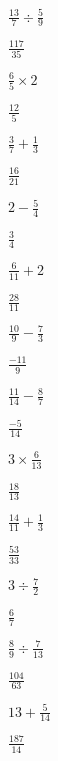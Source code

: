 \documentclass[12pt]{exam}
\begin{document}
\begin{questions}
\begin{multicols}{2}
			\question $\frac{13}{7} \div \frac{5}{9}$
			\begin{solution}
				$\frac{117}{35}$
			\end{solution}

			\question $\frac{6}{5} \times 2$
			\begin{solution}
				$\frac{12}{5}$
			\end{solution}

			\question $\frac{3}{7} + \frac{1}{3}$
			\begin{solution}
				$\frac{16}{21}$
			\end{solution}

			\question $2 - \frac{5}{4}$
			\begin{solution}
				$\frac{3}{4}$
			\end{solution}

			\question $\frac{6}{11} + 2$
			\begin{solution}
				$\frac{28}{11}$
			\end{solution}

			\question $\frac{10}{9} - \frac{7}{3}$
			\begin{solution}
				$\frac{-11}{9}$
			\end{solution}

			\question $\frac{11}{14} - \frac{8}{7}$
			\begin{solution}
				$\frac{-5}{14}$
			\end{solution}

			\question $3 \times \frac{6}{13}$
			\begin{solution}
				$\frac{18}{13}$
			\end{solution}

			\question $\frac{14}{11} + \frac{1}{3}$
			\begin{solution}
				$\frac{53}{33}$
			\end{solution}

			\question $3 \div \frac{7}{2}$
			\begin{solution}
				$\frac{6}{7}$
			\end{solution}

			\question $\frac{8}{9} \div \frac{7}{13}$
			\begin{solution}
				$\frac{104}{63}$
			\end{solution}

			\question $13 + \frac{5}{14}$
			\begin{solution}
				$\frac{187}{14}$
			\end{solution}


\end{multicols}
\end{questions}
\end{document}
